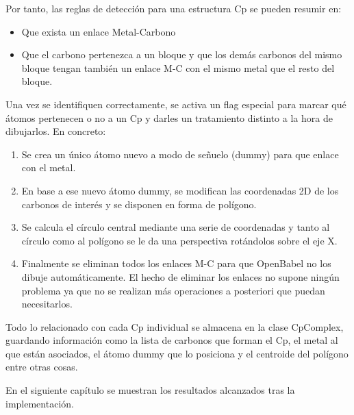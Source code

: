 Por tanto, las reglas de detección para una estructura Cp se pueden resumir en:
\begin{itemize}
    \item Que exista un enlace Metal-Carbono
    \item Que el carbono pertenezca a un bloque y que los demás carbonos del mismo bloque tengan también un enlace M-C con el mismo metal que el resto del bloque.
\end{itemize}

Una vez se identifiquen correctamente, se activa un flag especial para marcar qué átomos pertenecen o no a un Cp y darles un tratamiento distinto a la hora de dibujarlos. En concreto:  
\begin{enumerate}
    \item Se crea un único átomo nuevo a modo de señuelo (dummy) para que enlace con el metal.
    \item En base a ese nuevo átomo dummy, se modifican las coordenadas 2D de los carbonos de interés y se disponen en forma de polígono.
    \item Se calcula el círculo central mediante una serie de coordenadas y tanto al círculo como al polígono se le da una perspectiva rotándolos sobre el eje X.
    \item Finalmente se eliminan todos los enlaces M-C para que OpenBabel no los dibuje automáticamente. El hecho de eliminar los enlaces no supone ningún problema ya que no se realizan más operaciones a posteriori que puedan necesitarlos.
\end{enumerate} 

Todo lo relacionado con cada Cp individual se almacena en la clase CpComplex, guardando información como la lista de carbonos que forman el Cp, el metal al que están asociados, el átomo dummy que lo posiciona y el centroide del polígono entre otras cosas.

En el siguiente capítulo se muestran los resultados alcanzados tras la implementación.














